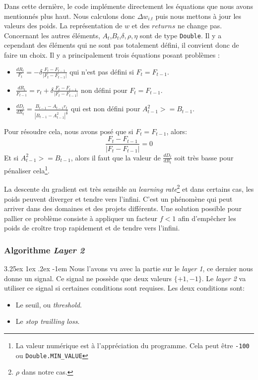 \documentclass[a4paper, 11pt]{article}
\makeatletter
\renewcommand\paragraph{\@startsection{paragraph}{5}{\z@}%
  {3.25ex \@plus1ex \@minus.2ex}%
  {-1em}%
  {\normalfont\normalsize\bfseries}}
\makeatother
\begin{document}
Dans cette dernière, le code implémente directement les équations que nous avons mentionnés plus haut. Nous calculons donc $\Delta w_{i.t}$ puis
nous mettons à jour les valeurs des poids. La représentation de $w$ et des $returns$ ne change pas. Concernant les autres éléments, 
$A_t$,$B_t$,$\delta,\rho,\eta$ sont de type \texttt{Double}. Il y a cependant des éléments qui ne sont pas totalement défini, il convient donc de faire 
un choix. Il y a principalement trois équations posant problèmes :
\begin{itemize}
 \item $\frac{dR_t}{F_t} = -\delta \frac{F_t - F_{t-1}}{|F_t - F_{t-1}|}$ qui n'est pas défini si $F_t = F_{t-1}$.\\
 \item $\frac{dR_t}{F_{t-1}} = r_t + \delta \frac{F_t - F_{t-1}}{|F_t - F_{t-1}|}$ non défini pour $F_t = F_{t-1}$.\\
 \item $\frac{dD_t}{dR_t} = \frac{B_{t-1} - A_{t-1}r_t}{|B_{t-1} - A_{t-1}^2|^{\frac{3}{2}}}$ qui est non défini pour $A_{t-1}^2 >= B_{t-1}$.
\end{itemize}

Pour résoudre cela, nous avons posé que si $F_t = F_{t-1}$, alors: 
$$\frac{F_t - F_{t-1}}{|F_t - F_{t-1}|} = 0$$
Et si $A_{t-1}^2 >= B_{t-1}$, alors il faut que la valeur de $\frac{dD_t}{dR_t}$ soit très basse pour pénaliser cela\footnote{La valeur numérique est à 
l'appréciation du programme. Cela peut être \texttt{-100} ou \texttt{Double.MIN\_VALUE}}.

La descente du gradient est très sensible au \textit{learning rate}\footnote{$\rho$ dans notre cas.} et dans certains cas, les poids peuvent diverger et
tendre vers l'infini. C'est un phénomène qui peut arriver dans des domaines et des projets différents. Une solution possible pour pallier ce problème 
consiste à appliquer un facteur $f < 1$ afin d'empêcher les poids de croître trop rapidement et de tendre vers l'infini.

\subsubsection{Algorithme \textit{Layer 2}}
\paragraph{}
Nous l'avons vu avec la partie sur le \textit{layer 1}, ce dernier nous donne un signal. Ce signal ne possède que deux valeurs $\{+1,-1\}$. Le
\textit{layer 2} va utiliser ce signal si certaines conditions sont requises.
Les deux conditions sont:
\begin{itemize}
 \item Le seuil, ou \textit{threshold}.
 \item Le \textit{stop trailling loss}.
\end{itemize}
\end{document}
